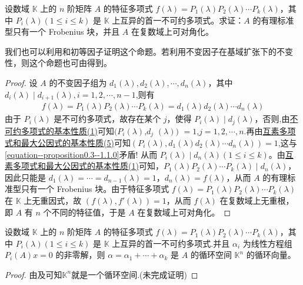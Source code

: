 \documentclass[../../main.tex]{subfiles}%
\begin{document}
\begin{proposition}\label{proposition:特征多项式在数域K上的不可约分解则在复数域上可对角化}
设数域 $\mathbb{K}$ 上的 $n$ 阶矩阵 $A$ 的特征多项式 $f(\lambda)=P_1(\lambda)P_2(\lambda)\cdots P_k(\lambda)$，其中 $P_i(\lambda) (1\leqslant  i\leqslant  k)$ 是 $\mathbb{K}$ 上互异的首一不可约多项式。求证：$A$ 的有理标准型只有一个 Frobenius 块，并且 $A$ 在复数域上可对角化。
\end{proposition}
\begin{remark}
我们也可以利用和初等因子证明这个命题。若利用不变因子在基域扩张下的不变性，则这个命题也可由得到。
\end{remark}
\begin{proof}

设 $A$ 的不变因子组为 $d_1(\lambda),d_2(\lambda),\cdots,d_n(\lambda)$，其中$d_{i}(\lambda)\mid d_{i+1}(\lambda),i=1,2,\cdots,n-1$,则有
\begin{align}\label{equation--proposition0.3--1.1.0}
f(\lambda)=P_1(\lambda)P_2(\lambda)\cdots P_k(\lambda)=d_1(\lambda)d_2(\lambda)\cdots d_n(\lambda)
\end{align}
由于 $P_i(\lambda)$ 是不可约多项式，故存在某个 $j$，使得 $P_i(\lambda)\mid d_j(\lambda)$，否则,由\hyperref[proposition:不可约多项式的基本性质]{不可约多项式的基本性质(1)}可知$(P_i(\lambda)$,$d_j$ $(\lambda))$ $=1$,$j=1,2,\cdots,n$.再由\hyperref[proposition:互素多项式和最大公因式的基本性质]{互素多项式和最大公因式的基本性质(5)}可知$(P_i(\lambda),d_1(\lambda)d_2(\lambda)\cdots d_n(\lambda))=1$,这与\eqref{equation--proposition0.3--1.1.0}矛盾!
从而 $P_i(\lambda)\mid d_n(\lambda) (1\leqslant  i\leqslant  k)$。由\hyperref[proposition:互素多项式和最大公因式的基本性质]{互素多项式和最大公因式的基本性质(1)}可知，$P_1(\lambda)P_2(\lambda)\cdots P_k(\lambda)\mid d_n(\lambda)$，因此只能是 $d_1(\lambda)=\cdots = d_{n - 1}(\lambda)=1$，$d_n(\lambda)=f(\lambda)$，从而 $A$ 的有理标准型只有一个 Frobenius 块。由于特征多项式 $f(\lambda)=P_1(\lambda)P_2(\lambda)\cdots P_k(\lambda)$ 在 $\mathbb{K}$ 上无重因式，故 $(f(\lambda),f'(\lambda)) = 1$，从而 $f(\lambda)$ 在复数域上无重根，即 $A$ 有 $n$ 个不同的特征值，于是 $A$ 在复数域上可对角化。

\end{proof}

\begin{corollary}
设数域 $\mathbb{K}$ 上的 $n$ 阶矩阵 $A$ 的特征多项式 $f(\lambda)=P_1(\lambda)P_2(\lambda)\cdots P_k(\lambda)$，其中 $P_i(\lambda) (1\leqslant  i\leqslant  k)$ 是 $\mathbb{K}$ 上互异的首一不可约多项式.并且 $\alpha_i$ 为线性方程组 $P_i(A)x = 0$ 的非零解，则 $\alpha=\alpha_1 + \cdots + \alpha_k$ 是 $A$ 的循环空间 $\mathbb{K}^n$ 的循环向量。
\end{corollary}
\begin{proof}

由及可知$\mathbb{K}^n$就是一个循环空间.(未完成证明)

\end{proof}
\end{document}
